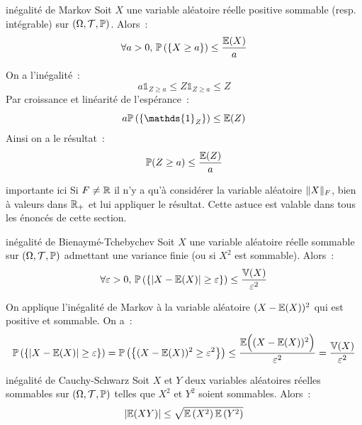 \begin{proposition}{}{inégalité de Markov}
    Soit $X$ une variable aléatoire réelle positive sommable (resp. intégrable) sur $(\Omega, \mathcal{T}, \mathbb{P})$. Alors~:
    $$\forall a > 0,\, \mathbb{P}\left(\left\{X \geq a\right\}\right) \leq \frac{\mathbb{E}(X)}{a}$$
\end{proposition}

\begin{demonstration}
    On a l'inégalité~:
    $$a \mathds{1}_{Z \geq a} \leq Z\mathds{1}_{Z \geq a} \leq Z$$
    Par croissance et linéarité de l'espérance~:
    $$a \probaset{\mathds{1}_Z} \leq \mb{E}(Z)$$
    Ainsi on a le résultat~:
    $$ \mathbb{P}(Z \geq a) \leq \frac{\mathbb{E}(Z)}{a}$$
\end{demonstration}

\begin{remarque}{}{importante ici}
    Si $F \neq \mathbb{R}$ il n'y a qu'à considérer la variable aléatoire $\lVert X\rVert_F$, bien à valeurs dans $\mathbb{R}_+$ et lui appliquer le résultat. Cette astuce est valable dans tous les énoncés de cette section.
\end{remarque}

\begin{proposition}{}{inégalité de Bienaymé-Tchebychev}
    Soit $X$ une variable aléatoire réelle sommable sur $(\Omega, \mathcal{T}, \mathbb{P})$ admettant une variance finie (ou si $X^2$ est sommable). Alors~:
    $$\forall \varepsilon > 0,\, \mathbb{P}\left(\left\{\vert X - \mathbb{E}(X) \vert \geq \varepsilon\right\}\right) \leq \frac{\mathbb{V}(X)}{\varepsilon^2}$$
\end{proposition}

\begin{demonstration}
    On applique l'inégalité de Markov à la variable aléatoire $(X - \mathbb{E}(X))^2$ qui est positive et sommable. On a~:
    $$\mathbb{P}\left(\left\{\vert X - \mathbb{E}(X) \vert \geq \varepsilon\right\}\right) = \mathbb{P}\left(\left\{(X - \mathbb{E}(X))^2 \geq \varepsilon^2\right\}\right) \leq \frac{\mathbb{E}\Big((X - \mathbb{E}(X))^2\Big)}{\varepsilon^2} = \frac{\mathbb{V}(X)}{\varepsilon^2}$$
\end{demonstration}


\begin{theoreme}{}{inégalité de Cauchy-Schwarz}
    Soit $X$ et $Y$ deux variables aléatoires réelles sommables sur $(\Omega, \mathcal{T}, \mathbb{P})$ telles que $X^2$ et $Y^2$ soient sommables. Alors~:
    $$\vert \mathbb{E}(XY) \vert \leq \sqrt{\mathbb{E}\left(X^2\right) \mathbb{E}\left(Y^2\right)}$$
\end{theoreme}

